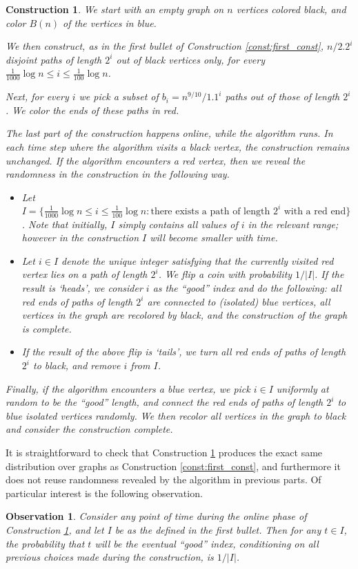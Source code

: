 \documentclass[11pt]{article}
\numberwithin{equation}{section}
\newtheorem{construction}[construction]{Construction}
\newtheorem{observation}[observation]{Observation}
\newcommand{\1}{\mathbf{1}}
\begin{document}
\begin{construction}
\label{const:red_blue_black}
We start with an empty graph on $n$ vertices colored black,
and color $B(n)$ of the vertices in blue.

We then construct, as in the first bullet of Construction \ref{const:first_const}, $n / 2.2^{i}$ disjoint paths of length $2^i$ out of black vertices only, for every $\frac{1}{1000}\log n \leq i \leq \frac{1}{100} \log n$.

Next, for every $i$ we pick a subset of $b_i = n^{9/10} / 1.1^i$ paths out of those of length $2^i$. We color the ends of these paths in red.

The last part of the construction happens online, while the algorithm runs. In each time step where the algorithm visits a black vertex, the construction remains unchanged. If the algorithm encounters a red vertex, then we reveal the randomness in the construction in the following way.
\begin{itemize}
    \item Let $I = \{ \frac{1}{1000}\log n \leq i \leq \frac{1}{100} \log n : \text{there exists a path of length $2^i$ with a red end}\}$. Note that initially, $I$ simply contains all values of $i$ in the relevant range; however in the construction $I$ will become smaller with time.
    \item Let $i \in I$ denote the unique integer satisfying that the currently visited red vertex lies on a path of length $2^i$.
    We flip a coin with probability $1/|I|$. If the result is `heads', we consider $i$ as the ``good'' index and do the following: all red ends of paths of length $2^i$ are connected to (isolated) blue vertices, all vertices in the graph are recolored by black, and the construction of the graph is complete.
    \item If the result of the above flip is `tails', we turn all red ends of paths of length $2^i$ to black, and remove $i$ from $I$.
\end{itemize}
Finally, if the algorithm encounters a blue vertex, we pick $i \in I$ uniformly at random to be the ``good'' length, and connect the red ends of paths of length $2^i$ to blue isolated vertices randomly. We then recolor all vertices in the graph to black and consider the construction complete.
\end{construction}

It is straightforward to check that Construction \ref{const:red_blue_black} produces the exact same distribution over graphs as Construction \ref{const:first_const}, and furthermore it does not reuse randomness revealed by the algorithm in previous parts.
Of particular interest is the following observation.
\begin{observation}
Consider any point of time during the online phase of Construction \ref{const:red_blue_black}, and let $I$ be as the defined in the first bullet. Then for any $t \in I$, the probability that $t$ will be the eventual ``good'' index, conditioning on all previous choices made during the construction, is $1/|I|$.
\end{observation}
\end{document}

